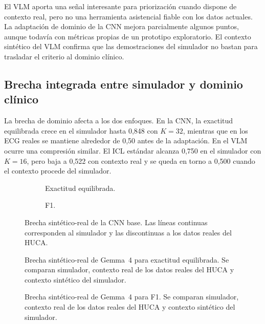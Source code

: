 El VLM aporta una señal interesante para priorización cuando dispone de contexto real, pero no una herramienta asistencial fiable con los datos actuales. La adaptación de dominio de la CNN mejora parcialmente algunos puntos, aunque todavía con métricas propias de un prototipo exploratorio. El contexto sintético del VLM confirma que las demostraciones del simulador no bastan para trasladar el criterio al dominio clínico.

\subsection{Brecha integrada entre simulador y dominio clínico}

La brecha de dominio afecta a los dos enfoques. En la CNN, la exactitud equilibrada crece en el simulador hasta 0,848 con \(K=32\), mientras que en los ECG reales se mantiene alrededor de 0,50 antes de la adaptación. En el VLM ocurre una compresión similar. El ICL estándar alcanza 0,750 en el simulador con \(K=16\), pero baja a 0,522 con contexto real y se queda en torno a 0,500 cuando el contexto procede del simulador.

\begin{figure}[H]
  \centering
  \begin{subfigure}{0.48\textwidth}
    \centering
    \caption{Exactitud equilibrada.}
  \end{subfigure}
  \hfill
  \begin{subfigure}{0.48\textwidth}
    \centering
    \caption{F1.}
  \end{subfigure}
  \caption{Brecha sintético-real de la CNN base. Las líneas continuas corresponden al simulador y las discontinuas a los datos reales del HUCA.}
  \label{fig:domain_gap_cnn}
\end{figure}

\begin{figure}[H]
  \centering
  \caption{Brecha sintético-real de Gemma~4 para exactitud equilibrada. Se comparan simulador, contexto real de los datos reales del HUCA y contexto sintético del simulador.}
  \label{fig:domain_gap_icl_context_ba}
\end{figure}

\begin{figure}[H]
  \centering
  \caption{Brecha sintético-real de Gemma~4 para F1. Se comparan simulador, contexto real de los datos reales del HUCA y contexto sintético del simulador.}
  \label{fig:domain_gap_icl_context_f1}
\end{figure}

